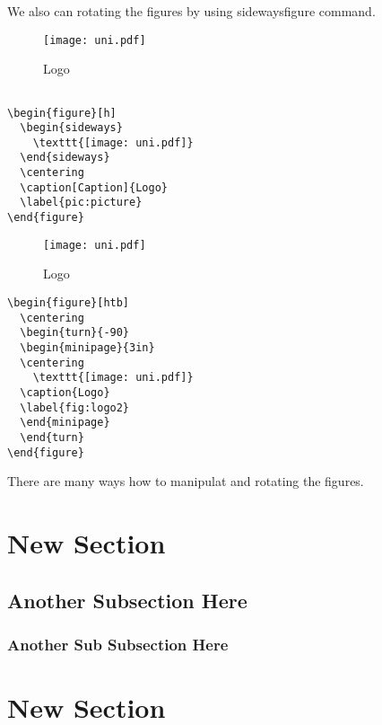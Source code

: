 We also can rotating the figures by using sidewaysfigure command.

\lipsum[1-2]

\begin{figure}[h]
  \begin{sideways}
    \texttt{[image: uni.pdf]}
  \end{sideways}
  \centering
  \caption[Caption]{Logo}
  \label{pic:picture}
\end{figure}

\begin{verbatim}

\begin{figure}[h]
  \begin{sideways}
    \texttt{[image: uni.pdf]}
  \end{sideways}
  \centering
  \caption[Caption]{Logo}
  \label{pic:picture}
\end{figure}
\end{verbatim}


\newpage 


\begin{figure}[htb]
  \centering
  \begin{turn}{-90}
  \begin{minipage}{3in}
  \centering
    \texttt{[image: uni.pdf]}
  \caption{Logo}
  \label{fig:logo2}
  \end{minipage}
  \end{turn}
\end{figure}




\begin{verbatim}
\begin{figure}[htb]
  \centering
  \begin{turn}{-90}
  \begin{minipage}{3in}
  \centering
    \texttt{[image: uni.pdf]}
  \caption{Logo}
  \label{fig:logo2}
  \end{minipage}
  \end{turn}
\end{figure}
\end{verbatim}


There are many ways how to manipulat and rotating the figures.
\section{New Section}

\lipsum

\subsection{Another Subsection Here}

\lipsum

\subsubsection{ Another Sub Subsection Here}

\lipsum

\section{ New Section}

\lipsum

\addblankpage %